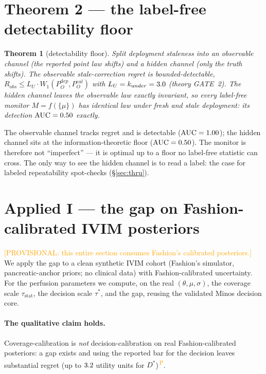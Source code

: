 \documentclass[11pt]{article}
\newcommand{\PROV}{\textsuperscript{\textcolor{orange}{\,P}}}
\newcommand{\provnote}[1]{{\small\textcolor{orange}{[PROVISIONAL: #1]}}}
\newtheorem{theorem}{Theorem}
\theoremstyle{definition}
\begin{document}
\section{Theorem 2 --- the label-free detectability floor}\label{sec:thy2}
\begin{theorem}[detectability floor]\label{thm:floor}
Split deployment staleness into an \emph{observable} channel (the reported point law shifts) and a
\emph{hidden} channel (only the truth shifts). The observable stale-correction regret is
bounded-detectable, $R_{\mathrm obs}\le L_U\cdot W_1(P_O^{\mathrm dep},P_O^{\mathrm cal})$ with
$L_U=k_{\mathrm under}=3.0$ (theory GATE~2). The hidden channel leaves the observable law exactly
invariant, so every label-free monitor $M=f(\{\mu\})$ has identical law under fresh and stale
deployment: its detection $\mathrm{AUC}=0.50$ exactly.
\end{theorem}
The observable channel tracks regret and is detectable ($\mathrm{AUC}=1.00$); the hidden channel
sits at the information-theoretic floor ($\mathrm{AUC}=0.50$). The monitor is therefore not
``imperfect'' --- it is optimal up to a floor no label-free statistic can cross. The only way to see
the hidden channel is to read a label: the case for labeled repeatability spot-checks (\S\ref{sec:thru}).

\section{Applied I --- the gap on Fashion-calibrated IVIM posteriors}\label{sec:cp2}
\provnote{this entire section consumes Fashion's calibrated posteriors.}
We apply the gap to a clean synthetic IVIM cohort (Fashion's simulator, pancreatic-anchor priors;
no clinical data) with Fashion-calibrated uncertainty. For the perfusion parameters we compute, on
the real $(\theta,\mu,\sigma)$, the coverage scale $\tau_{\mathrm{stat}}$, the decision scale
$\tau^*$, and the gap, reusing the validated Minos decision core.

\paragraph{The qualitative claim holds.} Coverage-calibration is \emph{not} decision-calibration on
real Fashion-calibrated posteriors: a gap exists and using the reported bar for the decision leaves
substantial regret (up to $3.2$ utility units for $D^*$)\PROV{}.
\end{document}
